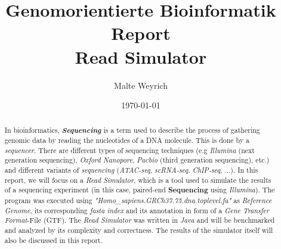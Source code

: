 \documentclass[12pt]{article}
\title{Genomorientierte Bioinformatik \\ Report \\ Read Simulator}
\author{Malte Weyrich}
\date{\today}
\begin{document}
\maketitle
\begin{abstract}
	In bioinformatics, \textit{\textbf{Sequencing}} is a term used to describe the process of gathering
	genomic data by reading the nucleotides of a DNA molecule. This is done by a \textit{sequencer}.
	There are different types of sequencing techniques (e.g \textit{Illumina} (next generation sequencing), \textit{Oxford Nanopore},
	\textit{Pacbio} (third generation sequencing), etc.)
	and different variants of \textit{sequencing} (\textit{ATAC-seq}, \textit{scRNA-seq}, \textit{ChIP-seq}, ...).
	In this report, we will focus on a \textit{Read Simulator}, which is a tool used to
	simulate the results of a sequencing experiment (in this case, paired-end \textbf{Sequencing} using \textit{Illumina}).
	The program was executed using \textit{"Homo\_sapiens.GRCh37.75.dna.toplevel.fa"} as \textit{Reference Genome},
	its corresponding \textit{fasta index} and its annotation in form of a \textit{Gene Transfer Format}-File (GTF).
	The \textit{Read Simulator} was written in \textit{Java} and will be benchmarked and analyzed by its complexity and correctness.
	The results of the simulator itself will also be discussed in this report.

\end{abstract}

\newpage



\end{document}
